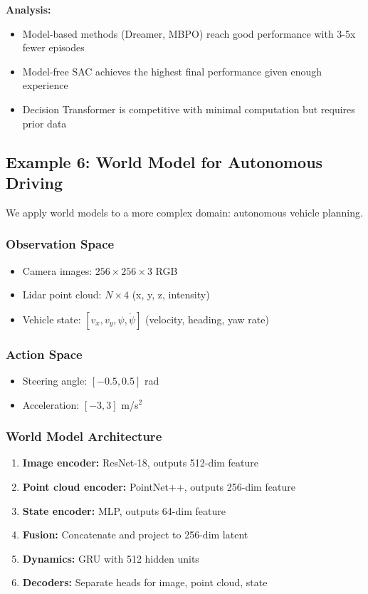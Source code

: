 \textbf{Analysis:}
\begin{itemize}
    \item Model-based methods (Dreamer, MBPO) reach good performance with 3-5x fewer episodes
    \item Model-free SAC achieves the highest final performance given enough experience
    \item Decision Transformer is competitive with minimal computation but requires prior data
\end{itemize}

\subsection{Example 6: World Model for Autonomous Driving}

We apply world models to a more complex domain: autonomous vehicle planning.

\subsubsection{Observation Space}

\begin{itemize}
    \item Camera images: $256 \times 256 \times 3$ RGB
    \item Lidar point cloud: $N \times 4$ (x, y, z, intensity)
    \item Vehicle state: $[v_x, v_y, \psi, \dot{\psi}]$ (velocity, heading, yaw rate)
\end{itemize}

\subsubsection{Action Space}

\begin{itemize}
    \item Steering angle: $[-0.5, 0.5]$ rad
    \item Acceleration: $[-3, 3]$ m/s$^2$
\end{itemize}

\subsubsection{World Model Architecture}

\begin{enumerate}
    \item \textbf{Image encoder:} ResNet-18, outputs 512-dim feature
    \item \textbf{Point cloud encoder:} PointNet++, outputs 256-dim feature
    \item \textbf{State encoder:} MLP, outputs 64-dim feature
    \item \textbf{Fusion:} Concatenate and project to 256-dim latent
    \item \textbf{Dynamics:} GRU with 512 hidden units
    \item \textbf{Decoders:} Separate heads for image, point cloud, state
\end{enumerate}

